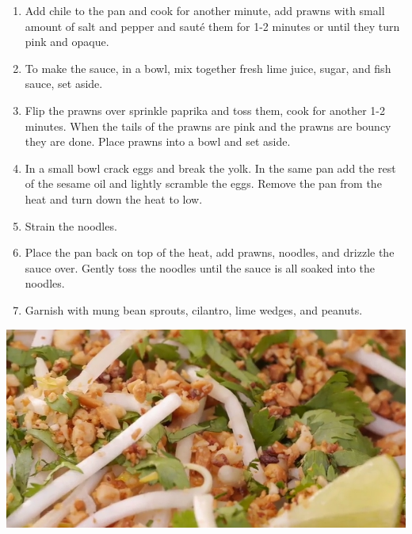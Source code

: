 \documentclass{article}
\begin{document}
\begin{multicols}{2}
\begin{enumerate}
\item Add chile to the pan and cook for another minute, add prawns with small amount of salt and pepper and sauté them for 1-2 minutes or until they turn pink and opaque.

\item To make the sauce, in a bowl, mix together fresh lime juice, sugar, and fish sauce, set aside.

\item Flip the prawns over sprinkle paprika and toss them, cook for another 1-2 minutes. When the tails of the prawns are pink and the prawns are bouncy they are done. Place prawns into a bowl and set aside.

\item In a small bowl crack eggs and break the yolk. In the same pan add the rest of the sesame oil and lightly scramble the eggs. Remove the pan from the heat and turn down the heat to low.

\item Strain the noodles.

\item Place the pan back on top of the heat, add prawns, noodles, and drizzle the sauce over. Gently toss the noodles until the sauce is all soaked into the noodles.

\item Garnish with mung bean sprouts, cilantro, lime wedges, and peanuts.
\end{enumerate}
\end{multicols}



\begin{center}
\includegraphics[scale=0.4]{ShrimpPadTai.png}
\end{center}
\end{document}
